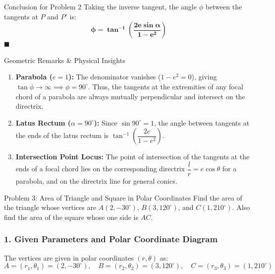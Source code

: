 \documentclass[11pt,a4paper]{article}
\begin{document}
\vspace{3mm}
\noindent
\begin{ansbox}{Conclusion for Problem 2}
Taking the inverse tangent, the angle $\phi$ between the tangents at $P$ and $P'$ is:
\[
\mathbf{\phi = \tan^{-1}\left(\frac{2e\sin\alpha}{1 - e^2}\right)}
\]
\hfill $\blacksquare$
\end{ansbox}

\vspace{3mm}
\begin{remarkbox}{Geometric Remarks \& Physical Insights}
\begin{enumerate}\setlength{\itemsep}{2pt}
    \item \textbf{Parabola ($e = 1$):} The denominator vanishes ($1 - e^2 = 0$), giving $\tan\phi \to \infty \implies \phi = 90^\circ$. Thus, the tangents at the extremities of any focal chord of a parabola are always mutually perpendicular and intersect on the directrix.
    \item \textbf{Latus Rectum ($\alpha = 90^\circ$):} Since $\sin 90^\circ = 1$, the angle between tangents at the ends of the latus rectum is $\tan^{-1}\left(\dfrac{2e}{1 - e^2}\right)$.
    \item \textbf{Intersection Point Locus:} The point of intersection of the tangents at the ends of a focal chord lies on the corresponding directrix $\dfrac{l}{r} = e\cos\theta$ for a parabola, and on the directrix line for general conics.
\end{enumerate}
\end{remarkbox}

\clearpage
\noindent
\begin{problembox}{Problem 3: Area of Triangle and Square in Polar Coordinates}
Find the area of the triangle whose vertices are $A(2, -30^\circ)$, $B(3, 120^\circ)$, and $C(1, 210^\circ)$. Also find the area of the square whose one side is $AC$.
\end{problembox}

\subsubsection*{1. Given Parameters and Polar Coordinate Diagram}
The vertices are given in polar coordinates $(r, \theta)$ as:
\[
A = (r_1, \theta_1) = (2, -30^\circ), \quad B = (r_2, \theta_2) = (3, 120^\circ), \quad C = (r_3, \theta_3) = (1, 210^\circ)
\]
\end{document}
